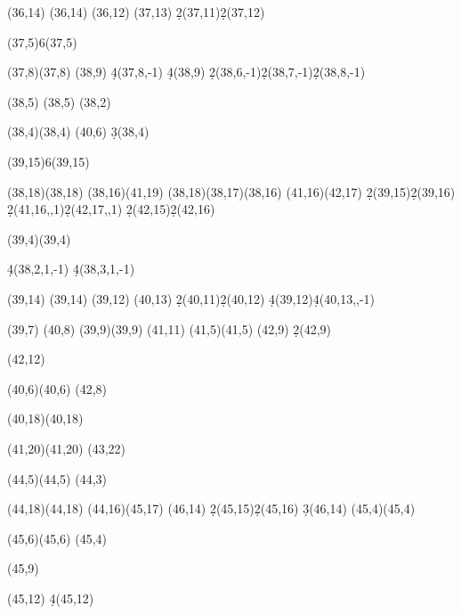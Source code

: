 \documentclass{article}
\begin{document}
\begin{sseqdata}
\class(36,14)
\divfourclass["P^2g" left](36,14)
\etaclass(36,12)
\divfourclass["Pk" {right=0em}](37,13)
\d2(37,11)\d2(37,12) %


\tower(37,5){6}\classoptions["x"](37,5)

\class["e_0g"](37,8)\etaclass(37,8)
\diveightclass["y" right](38,9)
\d4(37,8,-1) \d4(38,9)%
\d2(38,6,-1)\d2(38,7,-1)\d2(38,8,-1) %

\class(38,5)
\diveightclass["h_3h_5" below](38,5)
\etasqclass(38,2)

\class["e_1" {below=0em,xshift=2pt}](38,4)\etasqclass(38,4)
\divfourclass["f_1" right](40,6)
\d3(38,4) %

\tower(39,15){6}\classoptions["P^2i" {right=0em}](39,15)

\class(38,18)\divfourclass["P^3d_0" {below left=0em}](38,18)
\etacubclass(38,16)\diveightclass["P^3e_0" {below=0em}](41,19)
\nustruct(38,18)\nustruct(38,17)\nustruct(38,16)
\etaclass(41,16)\divfourclass["P^2j" {below=0em}](42,17)
\d2(39,15)\d2(39,16) %
\d2(41,16,,1)\d2(42,17,,1) %
\d2(42,15)\d2(42,16) %



\class["c_0 h_5" {below=-0.3em}](39,4)\etaclass(39,4)

\d4(38,2,1,-1) \d4(38,3,1,-1) %


\class(39,14)
\divfourclass["Pd_0e_0" {below=-0.2em}](39,14)
\etaclass(39,12)
\divfourclass["Pl" {below=0em}](40,13)
\d2(40,11)\d2(40,12) %
\d4(39,12)\d4(40,13,,-1) %



\class["c_1g"](39,7)
\class["g^2"](40,8)
\class["u"](39,9)\etasqclass(39,9)
\divtwoclass["z"](41,11)
\class(41,5)\divfourclass["c_2"](41,5)
\class["v"](42,9)
\d2(42,9) %

\class["d_0^3"](42,12)

\class["Ph_1h_5" {right=0em}](40,6)\etasqclass(40,6)
\divfourclass["Ph_2h_5" {right=0em}](42,8)


\class["P^4c_0"](40,18)\etaclass(40,18)


\class["P^5h_1"](41,20)\etasqclass(41,20)
\divfourclass["P^5h_2" right](43,22)

\class(44,5)\divfourclass["g_2"](44,5)
\etaclass(44,3)

\class(44,18)\divfourclass["P^3g" left](44,18)
\etaclass(44,16)\divfourclass["P^2k" below](45,17)
\class["P^2r"](46,14)
\d2(45,15)\d2(45,16) %
\d3(46,14)%
\class(45,4)\divtwoclass["h_4^3" below](45,4)

\class(45,6)\divfourclass["h_5d_0" right](45,6)
\etaclass(45,4)

\class["w"](45,9)

\class["Pc_0g" left](45,12)
\d4(45,12) %
\end{sseqdata}
\end{document}
